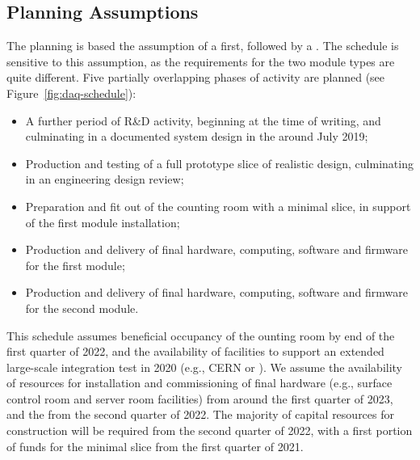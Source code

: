 \subsection{Planning Assumptions}
\label{sec:fd-daq-org-assmp}

The  planning is based the assumption of a  first, followed by a . The schedule is sensitive to this assumption, as the  requirements for the two module types are quite different. Five partially overlapping phases of activity are planned (see Figure~\ref{fig:daq-schedule}):

\begin{itemize}
	\item A further period of R\&D activity, beginning at the time of writing, and culminating in a documented system design in the  around July 2019;
	\item Production and testing of a full prototype  slice of realistic design, culminating in an engineering design review;
	\item Preparation and fit out of the  counting room with a minimal  slice, in support of the first module installation;
	\item Production and delivery of final hardware, computing, software and firmware for the first module;
	\item Production and delivery of final hardware, computing, software and firmware for the second module.
\end{itemize}

This schedule assumes beneficial occupancy of the  ounting room by end of the first quarter of 2022, and the availability of facilities to support an extended large-scale integration test in 2020 (e.g., CERN or \fnal). We assume the availability of resources for installation and commissioning of final  hardware (e.g., surface control room and server room facilities) from around the first quarter of 2023, and the  from the second quarter of 2022. The majority of capital resources for  construction will be required from the second quarter of 2022, with a first %
portion of funds for the minimal  slice from the first quarter of 2021.


